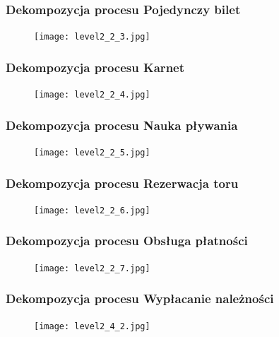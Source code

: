 \documentclass[a4paper,11pt]{article}
\begin{document}
\subsubsection{Dekompozycja procesu Pojedynczy bilet}
    \begin{figure}[!htb]
    \centerline{\texttt{[image: level2\_2\_3.jpg]}}
    \label{fig:level2_2_3}
    \end{figure}
    \newpage
    
\subsubsection{Dekompozycja procesu Karnet}
    \begin{figure}[!htb]
    \centerline{\texttt{[image: level2\_2\_4.jpg]}}
    \label{fig:level2_2_4}
    \end{figure}
    \newpage
    
\subsubsection{Dekompozycja procesu Nauka pływania}
    \begin{figure}[!htb]
    \centerline{\texttt{[image: level2\_2\_5.jpg]}}
    \label{fig:level2_2_5}
    \end{figure}
    \newpage
    
\subsubsection{Dekompozycja procesu Rezerwacja toru}
    \begin{figure}[!htb]
    \centerline{\texttt{[image: level2\_2\_6.jpg]}}
    \label{fig:level2_2_6}
    \end{figure}
    \newpage
    
\subsubsection{Dekompozycja procesu Obsługa płatności}
    \begin{figure}[!htb]
    \centerline{\texttt{[image: level2\_2\_7.jpg]}}
    \label{fig:level2_2_7}
    \end{figure}
    \newpage
    
\subsubsection{Dekompozycja procesu Wypłacanie należności}
    \begin{figure}[!htb]
    \centerline{\texttt{[image: level2\_4\_2.jpg]}}
    \label{fig:level2_4_2}
    \end{figure}
    \newpage
 
\end{document}
